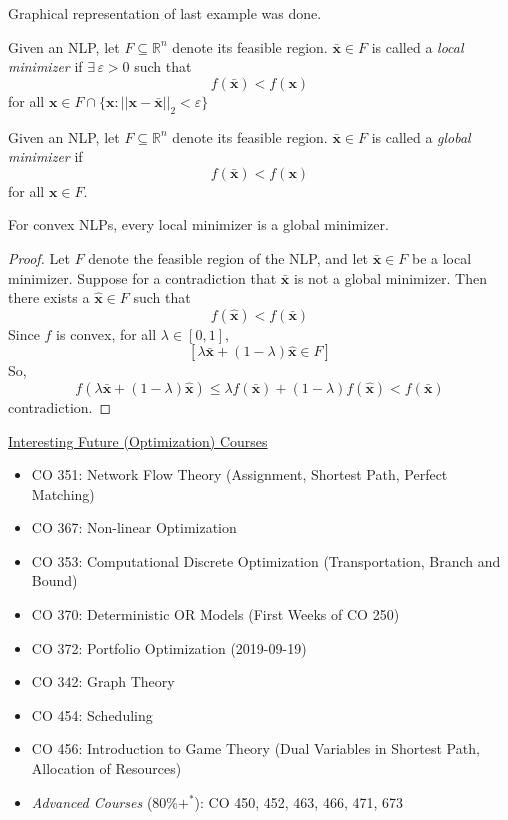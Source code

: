 Graphical representation of last example was done.
\begin{defbox}
    \begin{definition}
        Given an NLP, let $ F\subseteq \mathbb{R}^{n} $ denote its feasible region.
        $ \bm{\bar{x}}\in F $ is called a \emph{local minimizer} if $ \exists\,\varepsilon>0 $
        such that
        \[ f(\bm{\bar{x}})<f(\bm{x}) \]
        for all $ \bm{x}\in F\cap \{\bm{x}:||\bm{x}-\bm{\bar{x}}||_2 < \varepsilon\} $
    \end{definition}
\end{defbox}
\begin{defbox}
    \begin{definition}
        Given an NLP, let $ F\subseteq \mathbb{R}^{n} $ denote its feasible region.
        $ \bm{\bar{x}}\in F $ is called a \emph{global minimizer} if
        \[ f(\bm{\bar{x}})<f(\bm{x}) \]
        for all $ \bm{x}\in F $.
    \end{definition}
\end{defbox}
\begin{thmbox}
    \begin{theorem}
        For convex NLPs, every local minimizer is a global minimizer.
    \end{theorem}
\end{thmbox}

\begin{proof}
    Let $ F $ denote the feasible region of the NLP, and let $ \bm{\bar{x}}\in F $ be
    a local minimizer. Suppose for a contradiction that $ \bm{\bar{x}} $ is not
    a global minimizer. Then there exists a $ \bm{\hat{x}}\in F $ such that
    \[ f(\bm{\hat{x}})<f(\bm{\bar{x}}) \]
    Since $ f $ is convex, for all $ \lambda\in[0,1] $,
    \[ \left[ \lambda \bm{\bar{x}}+(1-\lambda)\bm{\hat{x}}\in F \right] \]
    So,
    \[ f(\lambda \bm{\bar{x}}+(1-\lambda)\bm{\hat{x}})\leqslant
    \lambda f(\bm{\bar{x}})+(1-\lambda)f(\bm{\hat{x}})<f(\bm{\bar{x}}) \]
    contradiction. 
\end{proof}

\underline{Interesting Future (Optimization) Courses}
\begin{itemize}
    \item CO 351: Network Flow Theory (Assignment, Shortest Path, Perfect Matching)
    \item CO 367: Non-linear Optimization
    \item CO 353: Computational Discrete Optimization (Transportation, Branch and Bound)
    \item CO 370: Deterministic OR Models (First Weeks of CO 250)
    \item CO 372: Portfolio Optimization (2019-09-19)
    \item CO 342: Graph Theory
    \item CO 454: Scheduling
    \item CO 456: Introduction to Game Theory (Dual Variables in Shortest Path, Allocation of Resources)
    \item \emph{Advanced Courses} ($ 80\%+^* $):
    \subitem CO 450, 452, 463, 466, 471, 673
\end{itemize}
